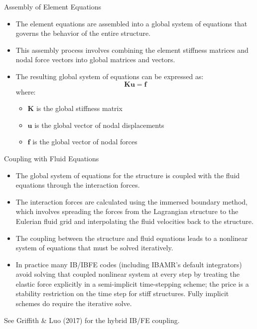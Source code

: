 \documentclass[aspectratio=169,11pt]{beamer}
\begin{document}
\begin{frame}{Assembly of Element Equations}
    \begin{itemize}
        \item The element equations are assembled into a global system of equations that governs the behavior of the entire structure.
        \item This assembly process involves combining the element stiffness matrices and nodal force vectors into global matrices and vectors.
        \item The resulting global system of equations can be expressed as:
        \begin{equation*}
        \mathbf{K} \mathbf{u} = \mathbf{f}
        \end{equation*}
        where:
        \begin{itemize}
            \item $\mathbf{K}$ is the global stiffness matrix
            \item $\mathbf{u}$ is the global vector of nodal displacements
            \item $\mathbf{f}$ is the global vector of nodal forces
        \end{itemize}
    \end{itemize}
\end{frame}

\begin{frame}{Coupling with Fluid Equations}
    \begin{itemize}
        \item The global system of equations for the structure is coupled with the fluid equations through the interaction forces.
        \item The interaction forces are calculated using the immersed boundary method, which involves spreading the forces from the Lagrangian structure to the Eulerian fluid grid and interpolating the fluid velocities back to the structure.
        \item The coupling between the structure and fluid equations leads to a nonlinear system of equations that must be solved iteratively.
        \item In practice many IB/IBFE codes (including IBAMR's default integrators) avoid solving that coupled nonlinear system at every step by treating the elastic force explicitly in a semi-implicit time-stepping scheme; the price is a stability restriction on the time step for stiff structures. Fully implicit schemes do require the iterative solve.
    \end{itemize}
    \vspace{1mm}
    {\tiny\color{DarkGray}See Griffith \& Luo (2017) for the hybrid IB/FE coupling.\par}
\end{frame}
\end{document}
